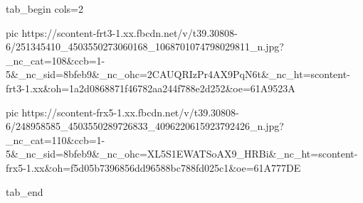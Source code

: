  
 
 
 
 

\ifcmt
  tab_begin cols=2

     pic https://scontent-frt3-1.xx.fbcdn.net/v/t39.30808-6/251345410_4503550273060168_1068701074798029811_n.jpg?_nc_cat=108&ccb=1-5&_nc_sid=8bfeb9&_nc_ohc=2CAUQRIzPr4AX9PqN6t&_nc_ht=scontent-frt3-1.xx&oh=1a2d0868871f46782aa244f788e2d252&oe=61A9523A

     pic https://scontent-frx5-1.xx.fbcdn.net/v/t39.30808-6/248958585_4503550289726833_4096220615923792426_n.jpg?_nc_cat=110&ccb=1-5&_nc_sid=8bfeb9&_nc_ohc=XL5S1EWATSoAX9_HRBi&_nc_ht=scontent-frx5-1.xx&oh=f5d05b7396856dd96588bc788fd025c1&oe=61A777DE

  tab_end
\fi

